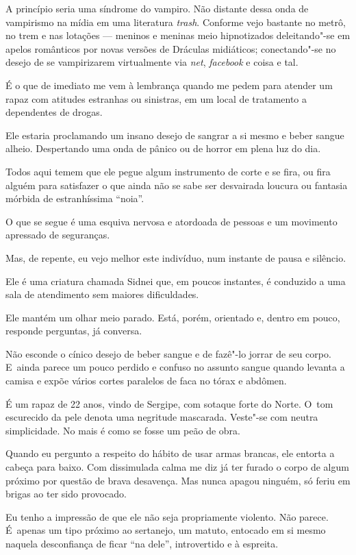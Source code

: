  

A princípio seria uma síndrome do vampiro. Não distante dessa onda de
vampirismo na mídia em uma literatura \emph{trash}. Conforme vejo
bastante no metrô, no trem e nas lotações --- meninos e meninas meio
hipnotizados deleitando"-se em apelos românticos por novas versões de
Dráculas midiáticos; conectando"-se no desejo de se vampirizarem
virtualmente via \emph{net}, \emph{facebook} e coisa e tal.

É o que de imediato me vem à lembrança quando me pedem para atender um
rapaz com atitudes estranhas ou sinistras, em um local de tratamento a
dependentes de drogas.

Ele estaria proclamando um insano desejo de sangrar a si mesmo e beber
sangue alheio. Despertando uma onda de pânico ou de horror em plena luz
do dia.

Todos aqui temem que ele pegue algum instrumento de corte e se fira, ou
fira alguém para satisfazer o que ainda não se sabe ser desvairada
loucura ou fantasia mórbida de estranhíssima ``noia''.

O que se segue é uma esquiva nervosa e atordoada de pessoas e um
movimento apressado de seguranças.

Mas, de repente, eu vejo melhor este indivíduo, num instante de pausa e
silêncio.

Ele é uma criatura chamada Sidnei que, em poucos instantes, é conduzido
a uma sala de atendimento sem maiores dificuldades.

Ele mantém um olhar meio parado. Está, porém, orientado e, dentro em
pouco, responde perguntas, já conversa.

Não esconde o cínico desejo de beber sangue e de fazê"-lo jorrar de seu
corpo. E~ainda parece um pouco perdido e confuso no assunto sangue
quando levanta a camisa e expõe vários cortes paralelos de faca no tórax
e abdômen.

É um rapaz de 22 anos, vindo de Sergipe, com sotaque forte do Norte. O~tom escurecido da pele denota uma negritude mascarada. Veste"-se com
neutra simplicidade. No mais é como se fosse um peão de obra.

Quando eu pergunto a respeito do hábito de usar armas brancas, ele
entorta a cabeça para baixo. Com dissimulada calma me diz já ter furado
o corpo de algum próximo por questão de brava desavença. Mas nunca
apagou ninguém, só feriu em brigas ao ter sido provocado.

Eu tenho a impressão de que ele não seja propriamente violento. Não
parece. É~apenas um tipo próximo ao sertanejo, um matuto, entocado em si
mesmo naquela desconfiança de ficar ``na dele'', introvertido e à
espreita.

